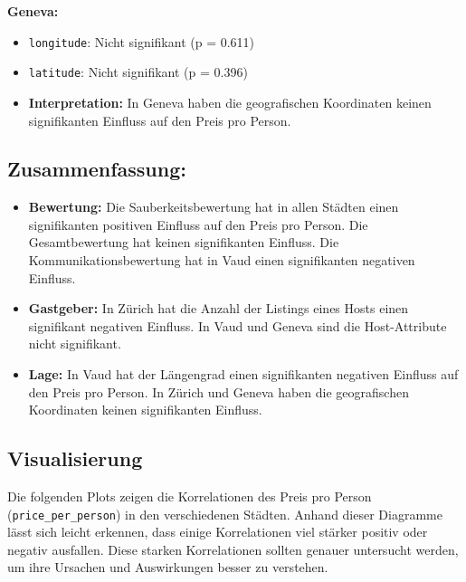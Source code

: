 \documentclass[
  journal,
]{IEEEtran}%
\providecommand{\tightlist}{%
  \setlength{\itemsep}{0pt}\setlength{\parskip}{0pt}}\usepackage{longtable,booktabs,array}
\begin{document}
\textbf{Geneva:}

\begin{itemize}
\item
  \texttt{longitude}: Nicht signifikant (p = 0.611)
\item
  \texttt{latitude}: Nicht signifikant (p = 0.396)
\item
  \textbf{Interpretation:} In Geneva haben die geografischen Koordinaten
  keinen signifikanten Einfluss auf den Preis pro Person.
\end{itemize}

\hypertarget{zusammenfassung}{%
\subsection{Zusammenfassung:}\label{zusammenfassung}}

\begin{itemize}
\tightlist
\item
  \textbf{Bewertung:} Die Sauberkeitsbewertung hat in allen Städten
  einen signifikanten positiven Einfluss auf den Preis pro Person. Die
  Gesamtbewertung hat keinen signifikanten Einfluss. Die
  Kommunikationsbewertung hat in Vaud einen signifikanten negativen
  Einfluss.
\item
  \textbf{Gastgeber:} In Zürich hat die Anzahl der Listings eines Hosts
  einen signifikant negativen Einfluss. In Vaud und Geneva sind die
  Host-Attribute nicht signifikant.
\item
  \textbf{Lage:} In Vaud hat der Längengrad einen signifikanten
  negativen Einfluss auf den Preis pro Person. In Zürich und Geneva
  haben die geografischen Koordinaten keinen signifikanten Einfluss.
\end{itemize}

\hypertarget{visualisierung-1}{%
\subsection{\texorpdfstring{\textbf{Visualisierung}}{Visualisierung}}\label{visualisierung-1}}

Die folgenden Plots zeigen die Korrelationen des Preis pro Person
(\texttt{price\_per\_person}) in den verschiedenen Städten. Anhand
dieser Diagramme lässt sich leicht erkennen, dass einige Korrelationen
viel stärker positiv oder negativ ausfallen. Diese starken Korrelationen
sollten genauer untersucht werden, um ihre Ursachen und Auswirkungen
besser zu verstehen.
\end{document}
